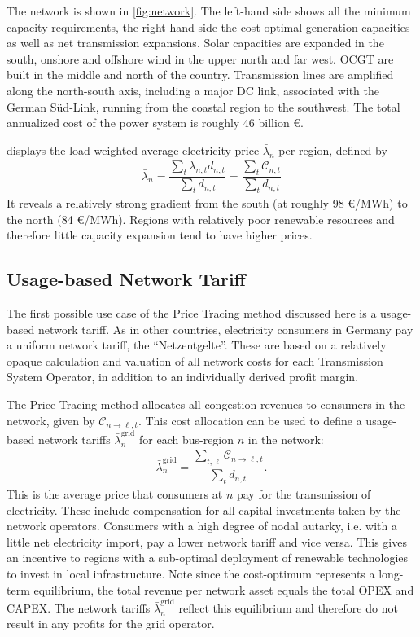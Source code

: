\documentclass[11pt,twocolumn]{article}
\newcommand{\lmp}[1][n]{\lambda_{#1,t}}
\newcommand{\averagelmp}[1][n]{\bar{\lambda}_{#1}}
\newcommand{\demand}[1][n]{d_{#1,t}}
\newcommand{\cost}{\mathcal{C}}
\newcommand{\payment}[1][n]{\cost_{#1,t}}
\newcommand{\allocatelinecost}[1][n \rightarrow \ell]{\cost_{#1, t}}
\begin{document}
The network is shown in  \cref{fig:network}. The left-hand side shows all the minimum capacity requirements, the right-hand side the cost-optimal generation capacities as well as net transmission expansions. Solar capacities are expanded in the south, onshore and offshore wind in the upper north and far west. \ac{OCGT} are built in the middle and north of the country. Transmission lines are amplified along the north-south axis, including a major \ac{DC} link, associated with the German S\"ud-Link, running from the coastal region to the southwest.
The total annualized cost of the power system is roughly 46 billion \euro.
% 

 displays the load-weighted average electricity price $\averagelmp$ per region, defined by
\begin{align}
    \averagelmp = \dfrac{\sum_{t} \lmp \demand}{\sum_t \demand} = \dfrac{\sum_{t} \payment }{\sum_t \demand}
\end{align}
It reveals a relatively strong gradient from the south (at roughly 98 \euro/MWh) to the north (84 \euro/MWh). Regions with relatively poor renewable resources and therefore little capacity expansion tend to have higher prices.
\\

\subsection{Usage-based Network Tariff}

The first possible use case of the Price Tracing method discussed here is a usage-based network tariff. As in other countries, electricity consumers in Germany pay a uniform network tariff, the ``Netzentgelte''. These are based on a relatively opaque calculation and valuation of all network costs for each Transmission System Operator, in addition to an individually derived profit margin.

The Price Tracing method allocates all congestion revenues to consumers in the network, given by $\allocatelinecost$. This cost allocation can be used to define a usage-based network tariffs $\averagelmp^\text{grid}$ for each bus-region $n$ in the network:
\begin{align}
    \averagelmp^\text{grid} = \dfrac{\sum_{t,\ell} \allocatelinecost}{\sum_t \demand}.
\end{align}
This is the average price that consumers at $n$ pay for the transmission of electricity. These include compensation for all capital investments taken by the network operators. Consumers with a high degree of nodal autarky, i.e. with a little net electricity import, pay a lower network tariff and vice versa. This gives an incentive to regions with a sub-optimal deployment of renewable technologies to invest in local infrastructure. Note since the cost-optimum represents a long-term equilibrium, the total revenue per network asset equals the total \ac{OPEX} and \ac{CAPEX}. The network tariffs $\averagelmp^\text{grid}$ reflect this equilibrium and therefore do not result in any profits for the grid operator.
\end{document}

